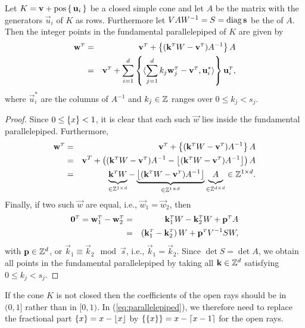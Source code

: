 \begin{lemma}
\label{l:fundamental}
Let $K = \vec v + \poshull \lb\, \vec u_i \,\rb$ be a closed simple cone
and let $A$ be the matrix with the generators $\vec u_i$ of $K$
as rows.
Furthermore let $V A W^{-1} = S = \diag \vec s$ be the  of $A$.
Then the integer points in the fundamental parallelepiped of $K$ are given
by
\begin{eqnarray}
\label{eq:parallelepiped}
\vec w^\T & = & \vec v^\T + \fractional{(\vec k^\T W - \vec v^\T) A^{-1}} A
\\
\nonumber
& = &
\vec v^\T +
\sum_{i=1}^d
    \fractional{\sps{\sum_{j=1}^d k_j \vec w^\T_j - \vec v^\T}{\vec u^*_i}}
	\vec u_i^\T,
\end{eqnarray}
where $\vec u^*_i$ are the columns of $A^{-1}$ and $k_j \in \mathbb{Z}$ ranges
over $0 \le k_j < s_j$.
\end{lemma}

\begin{proof}
Since $0 \le \left\{x\right\} < 1$, it is clear that each such $\vec w$
lies inside the fundamental parallelepiped.
Furthermore,
\begin{eqnarray*}
\vec w^\T & = & \vec v^\T + \fractional{(\vec k^\T W - \vec v^\T) A^{-1}} A
\\
& = &
\vec v^T + 
\left(
(\vec k^\T W - \vec v^\T) A^{-1} - \floor{(\vec k^\T W - \vec v^\T) A^{-1}}
\right) A
\\
& = &
\underbrace{\vec k^\T W\mathstrut}_{\in \ZZ^{1\times d}}
-
\underbrace{\floor{(\vec k^\T W - \vec v^\T) A^{-1}}}_{\in \ZZ^{1\times d}}
\underbrace{A\mathstrut}_{\in \ZZ^{d\times d}} \in \ZZ^{1\times d}.
\end{eqnarray*}
Finally, if two such $\vec w$ are equal, i.e., $\vec w_1 = \vec w_2$,
then
\begin{eqnarray*}
\vec 0^\T = \vec w_1^\T - \vec w_2^\T
& = & \vec k_1^\T W - \vec k_2^\T W + \vec p^\T A
\\
& = & \left(\vec k_1^\T - \vec k_2^\T \right) W + \vec p^\T V^{-1} S W,
\end{eqnarray*}
with $\vec p \in \ZZ^d$,
or $\vec k_1 \equiv \vec k_2 \mod \vec s$, i.e., $\vec k_1 = \vec k_2$.
Since $\det S = \det A$, we obtain all points in the fundamental parallelepiped
by taking all $\vec k \in \ZZ^d$ satisfying $0 \le k_j < s_j$.
\end{proof}

If the cone $K$ is not closed then the coefficients of the open rays
should be in $(0,1]$ rather than in $[0,1)$.
In (\ref{eq:parallelepiped}),
we therefore need to replace the fractional part $\left\{x\right\} = x - \left\lfloor x\right\rfloor$
by $\left\{\left\{x\right\}\right\} = x - \left\lceil x-1\right\rceil$ for the open rays.

